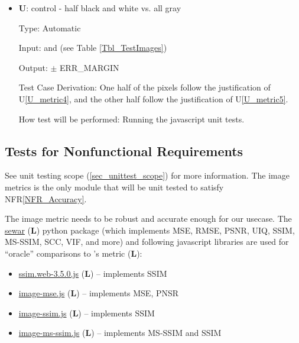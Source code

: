 \documentclass[12pt, titlepage]{article}
\newcommand{\nfrref}[1]{NFR\ref{#1}}
\newcommand{\ttref}[1]{Table \ref{#1}}
\newcounter{testnum} %
\newcounter{unittestnum} %
\newcommand{\utref}[1]{U\ref{#1}}
\newcounter{libnum} %
\begin{document}
\begin{itemize}
\item{\textbf{U\theunittestnum \label{U_metric6}}: control - half black and white vs. all gray}

Type: Automatic

Input:  and  (see \ttref{Tbl_TestImages})

Output:  $\pm$ ERR\_MARGIN

Test Case Derivation: One half of the pixels follow the justification of \utref{U_metric4},
and the other half follow the justification of \utref{U_metric5}.

How test will be performed: Running the javascript unit tests.

    
\end{itemize}


\newpage

\subsection{Tests for Nonfunctional Requirements} \label{sec_nfr_unittest}

See unit testing scope (\ref{sec_unittest_scope}) for more information.
The image metrics is the only module that will be unit tested to
satisfy \nfrref{NFR_Accuracy}.

The image metric needs to be robust and accurate enough for our usecase.
The \href{https://pypi.org/project/sewar}{sewar}
(\textbf{L\thelibnum \label{lib_sewar}})
python package (which implements MSE, RMSE, PSNR, UIQ, SSIM, MS-SSIM, SCC, VIF, and more)
and following javascript libraries are used for ``oracle'' comparisons
to \progname{}'s metric
(\textbf{L\thelibnum \label{lib_prog}}):
\begin{itemize}
  \item \href{https://github.com/obartra/ssim}{ssim.web-3.5.0.js} (\textbf{L\thelibnum \label{lib_ssim}})
    -- implements SSIM
  \item \href{https://github.com/darosh/image-mse-js}{image-mse.js} (\textbf{L\thelibnum \label{lib_mse}})
    -- implements MSE, PNSR
  \item \href{https://github.com/darosh/image-ssim-js}{image-ssim.js} (\textbf{L\thelibnum \label{lib_ssim1}})
    -- implements SSIM
  \item \href{https://github.com/darosh/image-ms-ssim-js}{image-ms-ssim.js} (\textbf{L\thelibnum \label{lib_msssim}})
    -- implements MS-SSIM and SSIM
\end{itemize}
\end{document}
